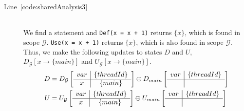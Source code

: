 \begin{description}
	\item[Line~\ref{code:sharedAnalysis3}] \hfill \\
		We find a statement and 
		\verb$Def(x = x + 1)$ returns $\lbrace x \rbrace$, which is found in 
		scope $\mathcal{G}$. \verb$Use(x = x + 1)$ returns $\lbrace x \rbrace$, 
		which is also found in scope $\mathcal{G}$. Thus, we make the following
		updates to states $D$ and $U$, $D_{\mathcal{G}}\left[x \rightarrow \lbrace main \rbrace \right]$
		and $U_{\mathcal{G}}\left[x \rightarrow \lbrace main \rbrace \right]$.
		\begin{align*}	
			D &= D_{\mathcal{G}} \left[
				\begin{array}{c | c}
					var	& \lbrace threadId \rbrace	\\ \hline
					x	& \lbrace main \rbrace
				\end{array}
			\right]
			\oplus
			D_{main} \left[
				\begin{array}{c | c c}
					var	& \lbrace threadId \rbrace	\\ \hline
						& 
				\end{array}
			\right] \\
			U &= U_{\mathcal{G}} \left[
				\begin{array}{c | c}
					var	& \lbrace threadId \rbrace	\\ \hline
					x	& \lbrace main \rbrace
				\end{array}
			\right]	
			\oplus
			U_{main}
			\left[
				\begin{array}{c | c c}
					var	& \lbrace threadId \rbrace	\\ \hline
						& 
				\end{array}
			\right]
		\end{align*}
		

\end{description}
